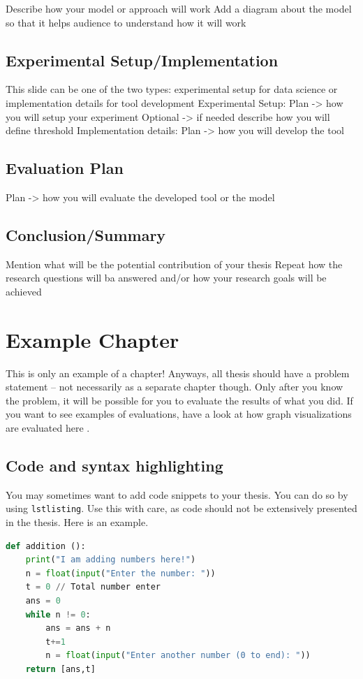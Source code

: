 \documentclass{imc-inf}
\begin{document}
Describe how your model or approach will work
Add a diagram about the model so that it helps audience to understand how it will work

\section{Experimental Setup/Implementation}
This slide can be one of the two types: experimental setup for data science or implementation details for tool development
Experimental Setup:
Plan -> how you will setup your experiment
Optional -> if needed describe how you will define threshold
Implementation details:
Plan -> how you will develop the tool

\section{Evaluation Plan}
Plan -> how you will evaluate the developed tool or the model

\section{Conclusion/Summary}

Mention what will be the potential contribution of your thesis
Repeat how the research questions will ba answered and/or how your research goals will be achieved


\chapter{Example Chapter}
This is only an example of a chapter! Anyways, all thesis should have a problem statement -- not necessarily as a separate chapter though. Only after you know the problem, it will be possible for you to evaluate the results of what you did. If you want to see examples of evaluations, have a look at how graph visualizations are evaluated here \cite{DBLP:journals/access/BurchHWPWH21}. 

\section{Code and syntax highlighting}

You may sometimes want to add code snippets to your thesis. You can do so by using \texttt{lstlisting}. Use this with care, as code should not be extensively presented in the thesis. Here is an example. 

\begin{lstlisting}[language=Python]
def addition ():
    print("I am adding numbers here!")
    n = float(input("Enter the number: "))
    t = 0 // Total number enter
    ans = 0
    while n != 0:
        ans = ans + n
        t+=1
        n = float(input("Enter another number (0 to end): "))
    return [ans,t]
\end{lstlisting}
\end{document}
